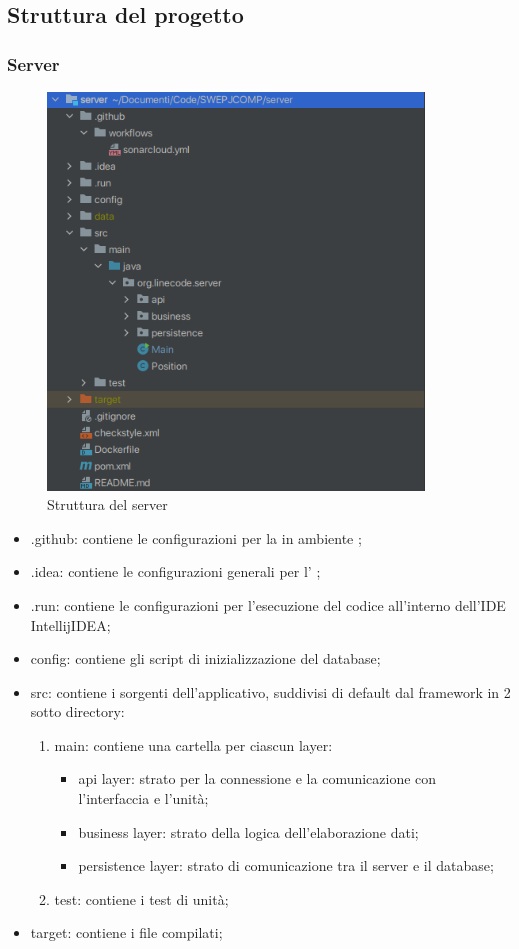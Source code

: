 \subsection{Struttura del progetto}
	\subsubsection{Server}
	
	\begin{figure}[H]
		\centering
		\includegraphics[width=10cm]{img/struttura_server.png}
		\caption{Struttura del server}
	\end{figure}

	\begin{itemize}
		\item{.github}: contiene le configurazioni per la  in ambiente ;
		\item{.idea}: contiene le configurazioni generali per l' ;
		\item{.run}: contiene le configurazioni per l'esecuzione del codice all'interno	dell'IDE IntellijIDEA;
		\item{config}: contiene gli script di inizializzazione del database;
		\item{src}: contiene i sorgenti dell'applicativo, suddivisi di default dal framework in 2 sotto	directory:
		\begin{enumerate}
			\item{main}: contiene una cartella per ciascun layer:
				\begin{itemize}
					\item{api layer}: strato per la connessione e la comunicazione con l'interfaccia e l'unità;
					\item{business layer}: strato della logica dell'elaborazione dati;
					\item{persistence layer}: strato di comunicazione tra il server e il database;
				\end{itemize}
			\item{test}: contiene i test di unità;
		\end{enumerate}
		\item{target}: contiene i file compilati;
	\end{itemize}

